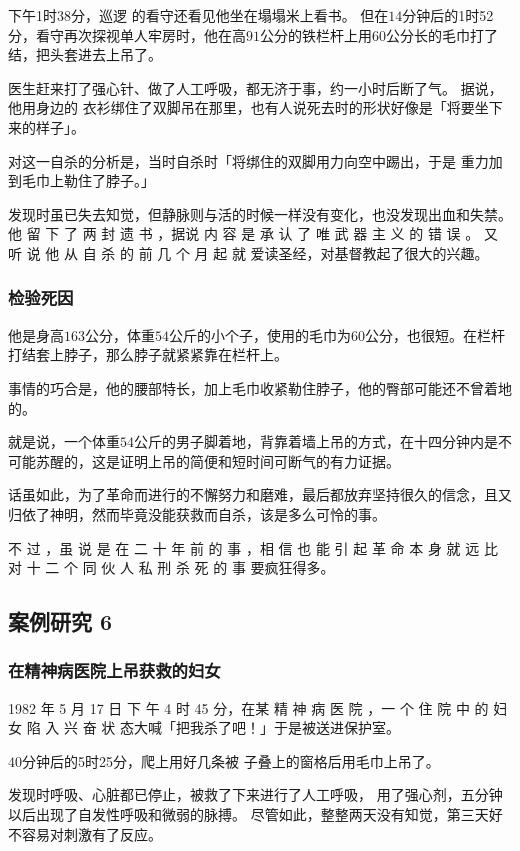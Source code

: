 \documentclass[UTF8]{ctexart}
\begin{document}
下午1时38分，巡逻 的看守还看见他坐在塌塌米上看书。
但在$14$分钟后的1时52分，看守再次探视单人牢房时，他在高$91$公分的铁栏杆上用$60$公分长的毛巾打了结，把头套进去上吊了。

医生赶来打了强心针、做了人工呼吸，都无济于事，约一小时后断了气。
据说，他用身边的 衣衫绑住了双脚吊在那里，也有人说死去时的形状好像是「将要坐下来的样子」。

对这一自杀的分析是，当时自杀时「将绑住的双脚用力向空中踢出，于是 重力加到毛巾上勒住了脖子。」

发现时虽已失去知觉，但静脉则与活的时候一样没有变化，也没发现出血和失禁。 
他 留 下 了 两 封 遗 书 ，据说 内 容 是 承 认 了 唯 武 器 主 义 的 错 误 。
又 听 说 他 从 自 杀 的 前 几 个 月 起 就 爱读圣经，对基督教起了很大的兴趣。

\subsubsection*{检验死因}

他是身高$163$公分，体重$54$公斤的小个子，使用的毛巾为$60$公分，也很短。在栏杆打结套上脖子，那么脖子就紧紧靠在栏杆上。

事情的巧合是，他的腰部特长，加上毛巾收紧勒住脖子，他的臀部可能还不曾着地的。

就是说，一个体重$54$公斤的男子脚着地，背靠着墙上吊的方式，在十四分钟内是不可能苏醒的，这是证明上吊的简便和短时间可断气的有力证据。

话虽如此，为了革命而进行的不懈努力和磨难，最后都放弃坚持很久的信念，且又归依了神明，然而毕竟没能获救而自杀，该是多么可怜的事。

不 过 ，虽 说 是 在 二 十 年 前 的 事 ，相 信 也 能 引 起 革 命 本 身 就 远 比 对 十 二 个 同 伙 人 私 刑 杀 死 的 事 要疯狂得多。

\subsection{案例研究 6}
\subsubsection*{在精神病医院上吊获救的妇女}

1982 年 5 月 17 日 下 午 4 时 45 分，在某 精 神 病 医 院 ，一 个 住 院 中 的 妇 女 陷 入 兴 奋 状 态大喊「把我杀了吧！」于是被送进保护室。

$40$分钟后的5时25分，爬上用好几条被 子叠上的窗格后用毛巾上吊了。

发现时呼吸、心脏都已停止，被救了下来进行了人工呼吸， 用了强心剂，五分钟以后出现了自发性呼吸和微弱的脉搏。 尽管如此，整整两天没有知觉，第三天好不容易对刺激有了反应。
\end{document}
